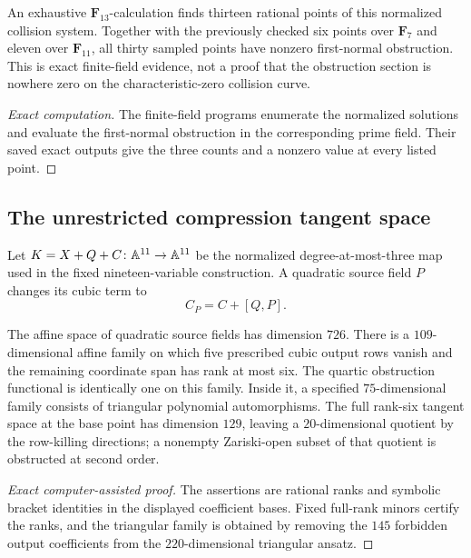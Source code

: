 \begin{proposition}
\label{prop:full-kernel-finite-field-samples}
An exhaustive \(\mathbf F_{13}\)-calculation finds thirteen rational points
of this normalized collision system.  Together with the previously checked
six points over \(\mathbf F_7\) and eleven over \(\mathbf F_{11}\), all
thirty sampled points have nonzero first-normal obstruction.  This is exact
finite-field evidence, not a proof that the obstruction section is nowhere
zero on the characteristic-zero collision curve.
\end{proposition}

\begin{proof}[Exact computation]
The finite-field programs enumerate the normalized solutions and evaluate the
first-normal obstruction in the corresponding prime field.  Their saved exact
outputs give the three counts and a nonzero value at every listed point.
\end{proof}

\subsection{The unrestricted compression tangent space}

Let \(K=X+Q+C\colon\mathbb A^{11}\to\mathbb A^{11}\) be the normalized
degree-at-most-three map used in the fixed nineteen-variable construction.
A quadratic source field \(P\) changes its cubic term to
\[
C_P=C+[Q,P].
\]

\begin{proposition}
\label{prop:row-killing-families}
The affine space of quadratic source fields has dimension \(726\).
There is a \(109\)-dimensional affine family on which five prescribed cubic
output rows vanish and the remaining coordinate span has rank at most six.
The quartic obstruction functional is identically one on this family.
Inside it, a specified \(75\)-dimensional family consists of triangular
polynomial automorphisms.  The full rank-six tangent space at the base point
has dimension \(129\), leaving a \(20\)-dimensional quotient by the
row-killing directions; a nonempty Zariski-open subset of that quotient is
obstructed at second order.
\end{proposition}

\begin{proof}[Exact computer-assisted proof]
The assertions are rational ranks and symbolic bracket identities in the
displayed coefficient bases.  Fixed full-rank minors certify the ranks, and
the triangular family is obtained by removing the \(145\) forbidden output
coefficients from the \(220\)-dimensional triangular ansatz.
\end{proof}


